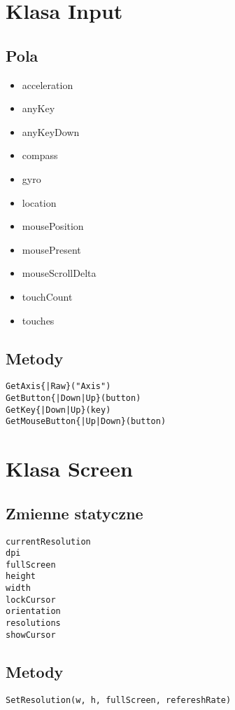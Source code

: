 \documentclass{article}
\begin{document}
\section{Klasa Input}
\subsection{Pola}
\begin{itemize}
    \item acceleration 
    \item anyKey
    \item anyKeyDown
    \item compass
    \item gyro
    \item location
    \item mousePosition
    \item mousePresent
    \item mouseScrollDelta
    \item touchCount
    \item touches
\end{itemize}

\subsection{Metody}
\begin{lstlisting}
GetAxis{|Raw}("Axis")
GetButton{|Down|Up}(button)
GetKey{|Down|Up}(key)
GetMouseButton{|Up|Down}(button)
\end{lstlisting}

\section{Klasa Screen}
\subsection{Zmienne statyczne}
\begin{lstlisting}
currentResolution
dpi
fullScreen
height
width
lockCursor
orientation
resolutions
showCursor
\end{lstlisting}

\subsection{Metody}
\begin{lstlisting}
SetResolution(w, h, fullScreen, refereshRate)
\end{lstlisting}
\end{document}
